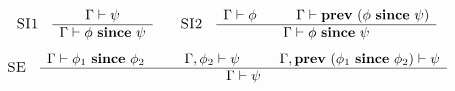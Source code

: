 \[
\begin{array}{cc}
\begin{array}{cc}
\mbox{\sc SI1}
&
\begin{array}{c}
\Gamma \vdash \psi  \\ \hline
\Gamma \vdash \phi\ \mathbf{since}\ \psi
\end{array}
\end{array}
&
\begin{array}{cc}
\mbox{\sc SI2}
&
\begin{array}{c}
\Gamma \vdash \phi \hspace*{1cm}
\Gamma \vdash \mathbf{prev}\ (\phi\ \mathbf{since}\ \psi)  \\ \hline
\Gamma \vdash \phi\ \mathbf{since}\ \psi
\end{array}
\end{array}
\end{array}
\]\vspace{-0.5em}
\[
\begin{array}{cc}
\mbox{\sc SE}
&
\begin{array}{c}
\Gamma \vdash \phi_1\ \mathbf{since}\ \phi_2 \hspace*{1cm}
\Gamma, \phi_2 \vdash \psi  \hspace*{1cm}
\Gamma, \mathbf{prev}\ (\phi_1\ \mathbf{since}\ \phi_2) \vdash \psi \\ \hline
\Gamma \vdash \psi
\end{array}
\end{array}
\]
